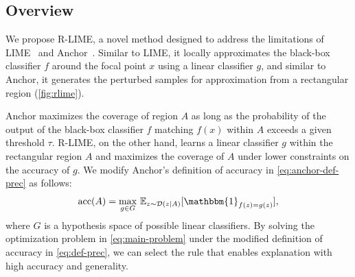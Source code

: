 \documentclass[runningheads]{llncs}
\begin{document}
{\subsection{Overview}
We propose R-LIME,
a novel method designed to address the limitations of LIME~\cite{ribeiro2016why}
and Anchor~\cite{ribeiro2018anchors}.
Similar to LIME,
it locally approximates the black-box classifier $f$
around the focal point $x$ using a linear classifier $g$,
and similar to Anchor,
it generates the perturbed samples for approximation
from a rectangular region (\cref{fig:rlime}).

Anchor maximizes the coverage of region $A$
as long as the probability of the output of the black-box classifier $f$ matching $f(x)$
within $A$ exceeds a given threshold $\tau$.
R-LIME, on the other hand, learns a linear classifier $g$
within the rectangular region $A$ and maximizes the coverage of $A$
under lower constraints on the accuracy of $g$.
We modify Anchor's definition of accuracy in \cref{eq:anchor-def-prec}
as follows:
\begin{equation}
  \Prec(A)=\underset{g\in G}{\max}\ \mathbb{E}_{z\sim\mathcal{D}(z|A)}
  [\mathbbm{1}_{f(z)=g(z)}], \label{eq:def-prec}
\end{equation}
where $G$ is a hypothesis space of possible linear classifiers.
By solving the optimization problem in \cref{eq:main-problem}
under the modified definition of accuracy in \cref{eq:def-prec},
we can select the rule that enables explanation with high accuracy and generality.

}
\end{document}
